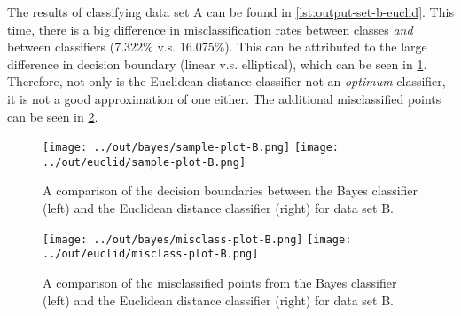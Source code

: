 \documentclass[headings=optiontoheadandtoc,listof=totoc,parskip=full]{scrartcl}
\begin{document}
The results of classifying data set A can be found in \cref{lst:output-set-b-euclid}. This time, there is a big difference in misclassification rates between classes \emph{and} between classifiers (7.322\% v.s. 16.075\%). This can be attributed to the large difference in decision boundary (linear v.s. elliptical), which can be seen in \cref{fig:sample-comparison-B}. Therefore, not only is the Euclidean distance classifier not an \emph{optimum} classifier, it is not a good approximation of one either. The additional misclassified points can be seen in \cref{fig:misclass-comparison-B}.



\begin{figure}[H]
	\centering
	\texttt{[image: ../out/bayes/sample-plot-B.png]}
	\texttt{[image: ../out/euclid/sample-plot-B.png]}
	\caption{A comparison of the decision boundaries between the Bayes classifier (left) and the Euclidean distance classifier (right) for data set B.}
	\label{fig:sample-comparison-B}
\end{figure}


\begin{figure}[H]
	\centering
	\texttt{[image: ../out/bayes/misclass-plot-B.png]}
	\texttt{[image: ../out/euclid/misclass-plot-B.png]}
	\caption{A comparison of the misclassified points from the Bayes classifier (left) and the Euclidean distance classifier (right) for data set B.}
	\label{fig:misclass-comparison-B}
\end{figure}
\end{document}
